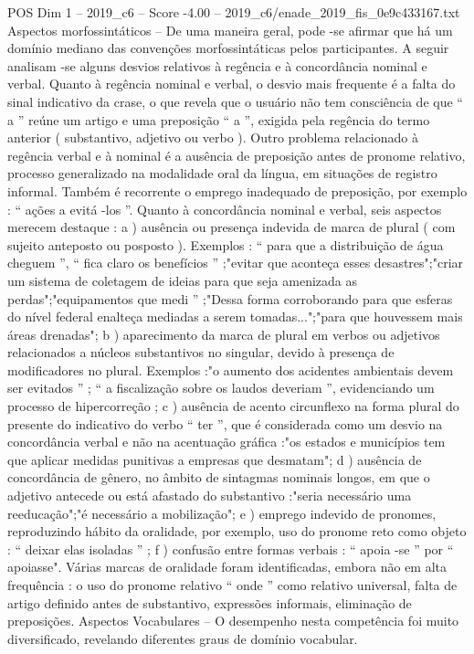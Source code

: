 \begin{textsample}{POS Dim 1 – 2019\_c6 – Score -4.00 – 2019\_c6/enade\_2019\_fis\_0e9c433167.txt}
Aspectos morfossintáticos – De uma maneira geral, pode -se afirmar que há um domínio mediano das convenções morfossintáticas pelos participantes.
A seguir analisam -se alguns desvios relativos à regência e à concordância nominal e verbal.
Quanto à regência nominal e verbal, o desvio mais frequente é a falta do sinal indicativo da crase, o que revela que o usuário não tem consciência de que “ a ” reúne um artigo e uma preposição “ a ”, exigida pela regência do termo anterior ( substantivo, adjetivo ou verbo ).
Outro problema relacionado à regência verbal e à nominal é a ausência de preposição antes de pronome relativo, processo generalizado na modalidade oral da língua, em situações de registro informal.
Também é recorrente o emprego inadequado de preposição, por exemplo : “ ações a evitá -los ”.
Quanto à concordância nominal e verbal, seis aspectos merecem destaque : a ) ausência ou presença indevida de marca de plural ( com sujeito anteposto ou posposto ).
Exemplos : “ para que a distribuição de água cheguem ”, “ fica claro os benefícios ” ;"evitar que aconteça esses desastres";"criar um sistema de coletagem de ideias para que seja amenizada as perdas";"equipamentos que medi ” ;"Dessa forma corroborando para que esferas do nível federal enalteça mediadas a serem tomadas...";"para que houvessem mais áreas drenadas"; b ) aparecimento da marca de plural em verbos ou adjetivos relacionados a núcleos substantivos no singular, devido à presença de modificadores no plural.
Exemplos :"o aumento dos acidentes ambientais devem ser evitados ” ; “ a fiscalização sobre os laudos deveriam ”, evidenciando um processo de hipercorreção ; c ) ausência de acento circunflexo na forma plural do presente do indicativo do verbo “ ter ”, que é considerada como um desvio na concordância verbal e não na acentuação gráfica :"os estados e municípios tem que aplicar medidas punitivas a empresas que desmatam"; d ) ausência de concordância de gênero, no âmbito de sintagmas nominais longos, em que o adjetivo antecede ou está afastado do substantivo :"seria necessário uma reeducação";"é necessário a mobilização"; e ) emprego indevido de pronomes, reproduzindo hábito da oralidade, por exemplo, uso do pronome reto como objeto : “ deixar elas isoladas ” ; f ) confusão entre formas verbais : “ apoia -se ” por “ apoiasse".
Várias marcas de oralidade foram identificadas, embora não em alta frequência : o uso do pronome relativo “ onde ” como relativo universal, falta de artigo definido antes de substantivo, expressões informais, eliminação de preposições.
Aspectos Vocabulares – O desempenho nesta competência foi muito diversificado, revelando diferentes graus de domínio vocabular.

\end{textsample}
